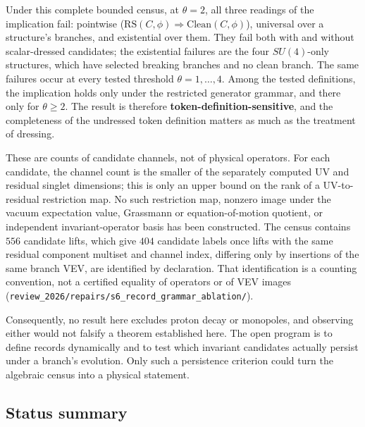 Under this complete bounded census, at \(\theta=2\), all three readings of the implication fail: pointwise
(\(\mathrm{RS}(C,\phi)\Rightarrow\mathrm{Clean}(C,\phi)\)), universal over a structure's branches, and existential over
them. They fail both with and without scalar-dressed candidates; the existential failures are the four
\(SU(4)\)-only structures, which have selected breaking branches and no clean branch. The same failures occur at
every tested threshold \(\theta=1,\dots,4\). Among the tested definitions, the implication holds only under the
restricted generator grammar, and there only for \(\theta\ge2\). The result is therefore \textbf{token-definition-sensitive}, and the completeness of
the undressed token definition matters as much as the treatment of dressing.

These are counts of candidate channels, not of physical operators. For each candidate, the channel count is the
smaller of the separately computed UV and residual singlet dimensions; this is only an upper bound on the rank of a
UV-to-residual restriction map. No such restriction map, nonzero image under the vacuum expectation value,
Grassmann or equation-of-motion quotient, or independent invariant-operator basis has been constructed. The census
contains \(556\) candidate lifts, which give \(404\) candidate labels once lifts with the same residual component
multiset and channel index, differing only by insertions of the same branch VEV, are identified by declaration. That
identification is a counting convention, not a certified equality of operators or of VEV images
(\nolinkurl{review_2026/repairs/s6_record_grammar_ablation/}).

Consequently, no result here excludes proton decay or monopoles, and observing either would not falsify a theorem
established here. The open program is to define records dynamically and to test which invariant candidates actually
persist under a branch's evolution. Only such a persistence criterion could turn the algebraic census into a physical
statement.

\subsection{Status summary}\label{prediction-status-summary}

